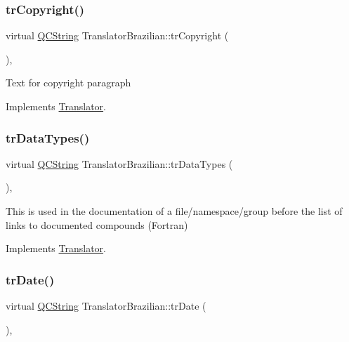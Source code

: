 \subsubsection{\texorpdfstring{trCopyright()}{trCopyright()}}
{\footnotesize\ttfamily virtual \mbox{\hyperlink{class_q_c_string}{Q\+C\+String}} Translator\+Brazilian\+::tr\+Copyright (\begin{DoxyParamCaption}{ }\end{DoxyParamCaption})\hspace{0.3cm}{\ttfamily [inline]}, {\ttfamily [virtual]}}

Text for copyright paragraph 

Implements \mbox{\hyperlink{class_translator}{Translator}}.

\mbox{\label{class_translator_brazilian_a4009f549ad0b70c51893c77e2785b7ea}} 
\subsubsection{\texorpdfstring{trDataTypes()}{trDataTypes()}}
{\footnotesize\ttfamily virtual \mbox{\hyperlink{class_q_c_string}{Q\+C\+String}} Translator\+Brazilian\+::tr\+Data\+Types (\begin{DoxyParamCaption}{ }\end{DoxyParamCaption})\hspace{0.3cm}{\ttfamily [inline]}, {\ttfamily [virtual]}}

This is used in the documentation of a file/namespace/group before the list of links to documented compounds (Fortran) 

Implements \mbox{\hyperlink{class_translator}{Translator}}.

\mbox{\label{class_translator_brazilian_a2516d240c6558f99075b575da9146fa1}} 
\subsubsection{\texorpdfstring{trDate()}{trDate()}}
{\footnotesize\ttfamily virtual \mbox{\hyperlink{class_q_c_string}{Q\+C\+String}} Translator\+Brazilian\+::tr\+Date (\begin{DoxyParamCaption}{ }\end{DoxyParamCaption})\hspace{0.3cm}{\ttfamily [inline]}, {\ttfamily [virtual]}}

